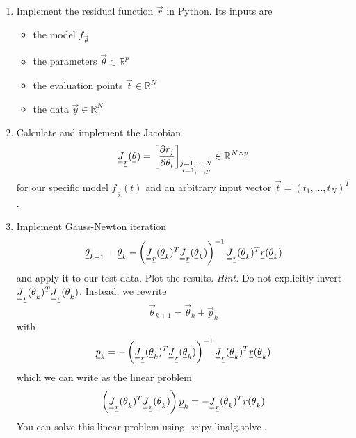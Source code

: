     \begin{enumerate}
        \item Implement the residual function $\vec{r}$ in Python. Its inputs are
        \begin{itemize}
            \item the model $f_\vec{\theta}$
            \item the parameters $\vec{\theta} \in \mathbb{R}^p$
            \item the evaluation points $\vec{t} \in \mathbb{R}^N$
            \item the data $\vec{y} \in \mathbb{R}^N$
        \end{itemize}
        \item Calculate and implement the Jacobian
        \begin{equation}
            \mat{J}_\vec{r}(\vec{\theta}) = \left[ \frac{\partial r_j}{\partial \theta_i} \right]_{\substack{
                j=1,...,N \\
                i=1,...,p
            }} \in \mathbb{R}^{N \times p}
        \end{equation}
        for our specific model $f_\vec{\theta}(t)$ and an arbitrary input vector $\vec{t} = (t_1,...,t_N)^T$.
        \item Implement Gauss-Newton iteration
        \begin{equation}
            \vec{\theta}_{k+1} = \vec{\theta}_k - \left( \mat{J}_\vec{r}(\vec{\theta}_k)^T \mat{J}_\vec{r}(\vec{\theta}_k) \right)^{-1} \mat{J}_\vec{r}(\vec{\theta}_k)^T \vec{r}(\vec{\theta}_k)
        \end{equation}
        and apply it to our test data. Plot the results. \textit{Hint:} Do not explicitly invert 
        $\mat{J}_\vec{r}(\vec{\theta}_k)^T \mat{J}_\vec{r}(\vec{\theta}_k)$. Instead, we rewrite
        \begin{equation}
            \vec{\theta}_{k+1} = \vec{\theta}_k + \vec{p}_k
        \end{equation}
        with
        \begin{equation}
            \vec{p}_k = - \left( \mat{J}_\vec{r}(\vec{\theta}_k)^T \mat{J}_\vec{r}(\vec{\theta}_k) \right)^{-1} \mat{J}_\vec{r}(\vec{\theta}_k)^T \vec{r}(\vec{\theta}_k)
        \end{equation}
        which we can write as the linear problem
        \begin{equation}
            \left( \mat{J}_\vec{r}(\vec{\theta}_k)^T \mat{J}_\vec{r}(\vec{\theta}_k) \right) \vec{p}_k = - \mat{J}_\vec{r}(\vec{\theta}_k)^T \vec{r}(\vec{\theta}_k)
        \end{equation}
        You can solve this linear problem using $\operatorname{scipy.linalg.solve}$.
    \end{enumerate}


\pagebreak
